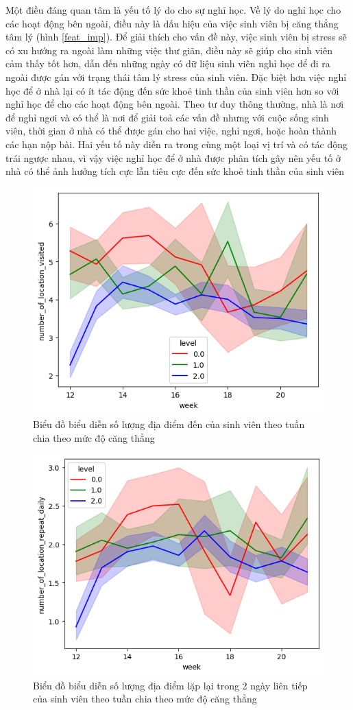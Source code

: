 Một điều đáng quan tâm là yếu tố lý do cho sự nghỉ học. Về lý do nghỉ học cho các hoạt động bên ngoài, điều này là dấu hiệu của việc sinh viên bị căng thẳng tâm lý (hình \ref{feat_imp}). Để giải thích cho vấn đề này, việc sinh viên bị stress sẽ có xu hướng ra ngoài làm những việc thư giãn, điều này sẽ giúp cho sinh viên cảm thấy tốt hơn, dẫn đến những ngày có dữ liệu sinh viên nghỉ học để đi ra ngoài được gán với trạng thái tâm lý stress của sinh viên. Đặc biệt hơn việc nghỉ học để ở nhà lại có ít tác động đến sức khoẻ tinh thần của sinh viên hơn so với nghỉ học để cho các hoạt động bên ngoài. Theo tư duy thông thường, nhà là nơi để nghỉ ngơi và có thể là nơi để giải toả các vấn đề nhưng với cuộc sống sinh viên, thời gian ở nhà có thể được gán cho hai việc, nghỉ ngơi, hoặc hoàn thành các hạn nộp bài. Hai yếu tố này diễn ra trong cùng một loại vị trí và có tác động trái ngược nhau, vì vậy việc nghỉ học để ở nhà được phân tích gây nên yếu tố ở nhà có thể ảnh hưởng tích cực lẫn tiêu cực đến sức khoẻ tinh thần của sinh viên




\begin{figure}[!ht]
    \centering
    \includegraphics[width=0.75\linewidth]{num_of_loc_by_week.png}
    \caption{Biểu đồ biểu diễn số lượng địa điểm đến của sinh viên theo tuần chia theo mức độ căng thẳng}
    \label{num_of_loc_week}
\end{figure}

\begin{figure}[!ht]
    \centering
    \includegraphics[width=0.75\linewidth]{num_of_location_daily_week.png}
    \caption{Biểu đồ biểu diễn số lượng địa điểm lặp lại trong 2 ngày liên tiếp của sinh viên theo tuần chia theo mức độ căng thẳng}
    \label{daily repeat}
\end{figure}

